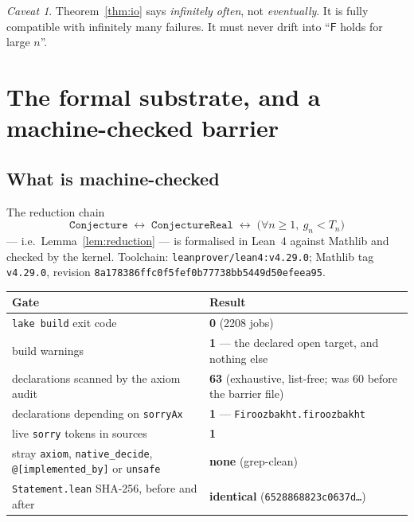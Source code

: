 \documentclass[11pt,a4paper]{article}
\theoremstyle{plain}
\theoremstyle{definition}
\theoremstyle{remark}
\newtheorem{hazard}[theorem]{Caveat}
\newcommand{\Fb}{\mathsf{F}}
\begin{document}
\begin{hazard}
Theorem~\ref{thm:io} says \emph{infinitely often}, not \emph{eventually}. It is fully
compatible with infinitely many failures. It must never drift into ``$\Fb$ holds for large
$n$''.
\end{hazard}

\section{The formal substrate, and a machine-checked barrier}
\label{sec:barrier}

\subsection{What is machine-checked}

The reduction chain
\[
\texttt{Conjecture} \;\leftrightarrow\; \texttt{ConjectureReal} \;\leftrightarrow\;
\bigl(\forall n \ge 1,\ g_n < T_n\bigr)
\]
--- i.e.\ Lemma~\ref{lem:reduction} --- is formalised in Lean~4 against Mathlib and checked
by the kernel. Toolchain: \texttt{leanprover/lean4:v4.29.0}; Mathlib tag \texttt{v4.29.0},
revision \texttt{8a178386\allowbreak ffc0f5fe\allowbreak f0b77738\allowbreak bb5449d5\allowbreak 0efeea95}.

\begin{center}
\small
\begin{tabular}{@{}p{} p{}@{}}
\toprule
Gate & Result \\
\midrule
\texttt{lake build} exit code & \textbf{0} (2208 jobs) \\
build warnings & \textbf{1} --- the declared open target, and nothing else \\
declarations scanned by the axiom audit & \textbf{63} (exhaustive, list-free; was 60 before the barrier file) \\
declarations depending on \texttt{sorryAx} & \textbf{1} --- \texttt{Firoozbakht.firoozbakht} \\
live \texttt{sorry} tokens in sources & \textbf{1} \\
stray \texttt{axiom}, \texttt{native\_decide}, \texttt{@[implemented\_by]} or \texttt{unsafe} & \textbf{none} (grep-clean) \\
\texttt{Statement.lean} SHA-256, before and after & \textbf{identical} (\texttt{6528868823c0637d\dots}) \\
\bottomrule
\end{tabular}
\end{center}
\end{document}
